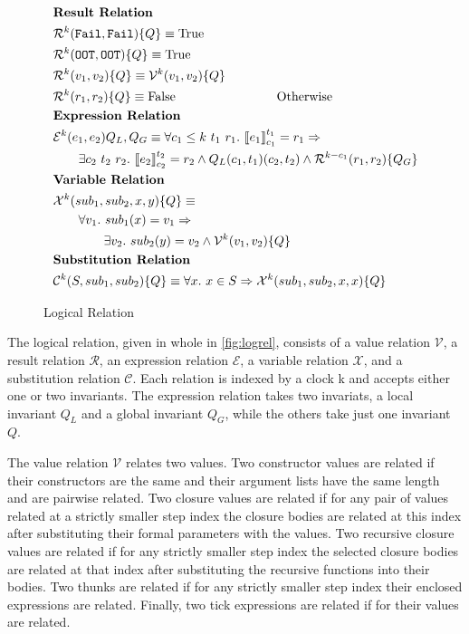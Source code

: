 \begin{figure}[p]
\begin{align*}
  &\textbf{Result Relation}\\
  &\mathcal{R}^k(\texttt{Fail}, \texttt{Fail})\{Q\} \equiv \text{True}\\
  &\mathcal{R}^k(\texttt{OOT}, \texttt{OOT})\{Q\} \equiv \text{True}\\
  &\mathcal{R}^k(v_1, v_2)\{Q\} \equiv \mathcal{V}^k(v_1, v_2)\{Q\}\\
  &\mathcal{R}^k(r_1, r_2)\{Q\} \equiv \text{False} \qquad\qquad\qquad\qquad \text{Otherwise}\\
  &\textbf{Expression Relation}\\
  &\mathcal{E}^k(e_1, e_2){Q_L,Q_G} \equiv
  \forall c_1 \le k\ t_1\ r_1.\ |[e_1|]_{c_1}^{t_1} = r_1 \Rightarrow\\
  &\qquad \exists c_2\ t_2\ r_2.\ |[e_2|]_{c_2}^{t_2} = r_2
  \land Q_L(c_1,t_1)(c_2,t_2)
  \land \mathcal{R}^{k-c_1}(r_1,r_2)\{Q_G\}\\
  &\textbf{Variable Relation}\\
  &\mathcal{X}^k(sub_1, sub_2, x, y)\{Q\} \equiv\\
  &\qquad \forall v_1.\ sub_1(x) = v_1 \Rightarrow\\
  &\qquad\qquad\exists v_2.\ sub_2(y) = v_2 \land \mathcal{V}^k(v_1, v_2)\{Q\}\\
  &\textbf{Substitution Relation}\\
  &\mathcal{C}^k(S, sub_1, sub_2)\{Q\} \equiv
  \forall x.\ x \in S \Rightarrow \mathcal{X}^k(sub_1, sub_2, x, x)\{Q\}
\end{align*}
\caption{\ThunkLang{} Logical Relation}
\label{fig:logrel}
\end{figure}

The logical relation, given in whole in \autoref{fig:logrel}, consists of a
value relation $\mathcal{V}$, a result relation $\mathcal{R}$, an expression
relation $\mathcal{E}$, a variable relation $\mathcal{X}$, and a substitution
relation $\mathcal{C}$. Each relation is indexed by a clock k and accepts either
one or two invariants. The expression relation takes two invariats, a local
invariant $Q_L$ and a global invariant $Q_G$, while the others take just one
invariant $Q$.

The value relation $\mathcal{V}$ relates two \ThunkLang{} values. Two
constructor values are related if their constructors are the same and their
argument lists have the same length and are pairwise related. Two closure values
are related if for any pair of values related at a strictly smaller step index
the closure bodies are related at this index after substituting their formal
parameters with the values. Two recursive closure values are related if for any
strictly smaller step index the selected closure bodies are related at that
index after substituting the recursive functions into their bodies. Two thunks
are related if for any strictly smaller step index their enclosed expressions
are related. Finally, two tick expressions are related if for their values are
related.

